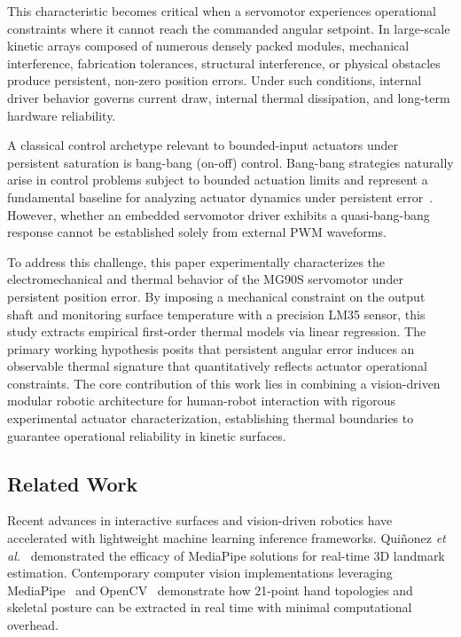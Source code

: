 \documentclass[lettersize,journal]{IEEEtran}
\begin{document}
This characteristic becomes critical when a servomotor experiences operational constraints where it cannot reach the commanded angular setpoint. In large-scale kinetic arrays composed of numerous densely packed modules, mechanical interference, fabrication tolerances, structural interference, or physical obstacles produce persistent, non-zero position errors. Under such conditions, internal driver behavior governs current draw, internal thermal dissipation, and long-term hardware reliability.

A classical control archetype relevant to bounded-input actuators under persistent saturation is bang-bang (on-off) control. Bang-bang strategies naturally arise in control problems subject to bounded actuation limits and represent a fundamental baseline for analyzing actuator dynamics under persistent error~\cite{boyd1991linear}. However, whether an embedded servomotor driver exhibits a quasi-bang-bang response cannot be established solely from external PWM waveforms.

To address this challenge, this paper experimentally characterizes the electromechanical and thermal behavior of the MG90S servomotor under persistent position error. By imposing a mechanical constraint on the output shaft and monitoring surface temperature with a precision LM35 sensor, this study extracts empirical first-order thermal models via linear regression. The primary working hypothesis posits that persistent angular error induces an observable thermal signature that quantitatively reflects actuator operational constraints. The core contribution of this work lies in combining a vision-driven modular robotic architecture for human-robot interaction with rigorous experimental actuator characterization, establishing thermal boundaries to guarantee operational reliability in kinetic surfaces.

\subsection{Related Work}
\label{sec:related_work}

Recent advances in interactive surfaces and vision-driven robotics have accelerated with lightweight machine learning inference frameworks. Qui{\~n}onez \textit{et al.}~\cite{quinonez2022mediapipe} demonstrated the efficacy of MediaPipe solutions for real-time 3D landmark estimation. Contemporary computer vision implementations leveraging MediaPipe~\cite{innovatiana2026mediapipe} and OpenCV~\cite{opencv2026library,omes2026deteccion} demonstrate how 21-point hand topologies and skeletal posture can be extracted in real time with minimal computational overhead. 
\end{document}
